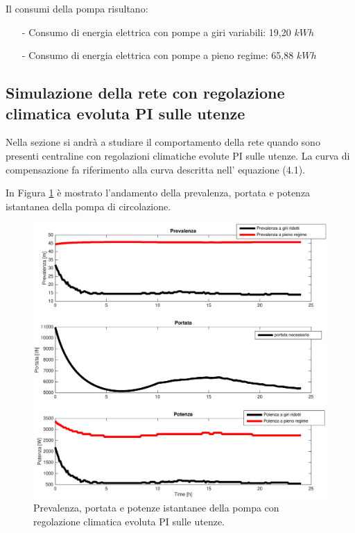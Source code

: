 \documentclass[laurea,oneside,11pt]{USiena_tesiLM3}
\begin{document}
Il consumi della pompa risultano:
\begin{itemize}
\item[-] Consumo di energia elettrica con pompe a giri variabili: 19,20 $kWh$ 
\item[-] Consumo di energia elettrica con pompe a pieno regime: 65,88 $kWh$
\end{itemize}

\subsection{Simulazione della rete con regolazione climatica evoluta PI sulle utenze}
Nella sezione si andrà a studiare il comportamento della rete quando sono presenti centraline con regolazioni climatiche evolute PI sulle utenze.  La curva di compensazione fa riferimento alla curva descritta nell' equazione (4.1).

In Figura \ref{fig:sim_PID} è mostrato l'andamento della prevalenza, portata e potenza istantanea della pompa di circolazione.

\begin{figure}[!ht]
\centering
\includegraphics[width=\textwidth]{figure/sim_PID} 
\caption{Prevalenza, portata e potenze istantanee della pompa con regolazione climatica evoluta PI sulle utenze.}
\label{fig:sim_PID}
\end{figure}
\end{document}
